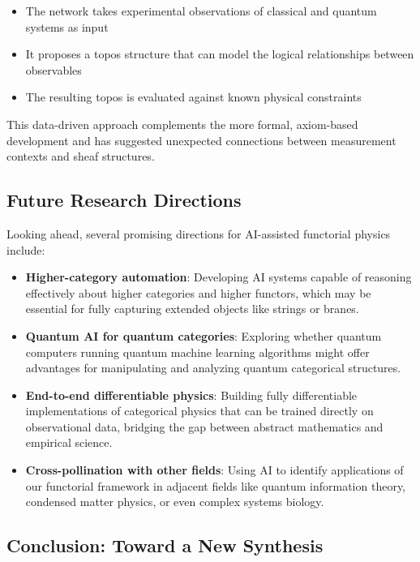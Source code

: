 \begin{itemize}
    \item The network takes experimental observations of classical and quantum systems as input
    \item It proposes a topos structure that can model the logical relationships between observables
    \item The resulting topos is evaluated against known physical constraints
\end{itemize}

This data-driven approach complements the more formal, axiom-based development and has suggested unexpected connections between measurement contexts and sheaf structures.

\subsection{Future Research Directions}

Looking ahead, several promising directions for AI-assisted functorial physics include:

\begin{itemize}
    \item \textbf{Higher-category automation}: Developing AI systems capable of reasoning effectively about higher categories and higher functors, which may be essential for fully capturing extended objects like strings or branes.
    
    \item \textbf{Quantum AI for quantum categories}: Exploring whether quantum computers running quantum machine learning algorithms might offer advantages for manipulating and analyzing quantum categorical structures.
    
    \item \textbf{End-to-end differentiable physics}: Building fully differentiable implementations of categorical physics that can be trained directly on observational data, bridging the gap between abstract mathematics and empirical science.
    
    \item \textbf{Cross-pollination with other fields}: Using AI to identify applications of our functorial framework in adjacent fields like quantum information theory, condensed matter physics, or even complex systems biology.
\end{itemize}

\subsection{Conclusion: Toward a New Synthesis}

